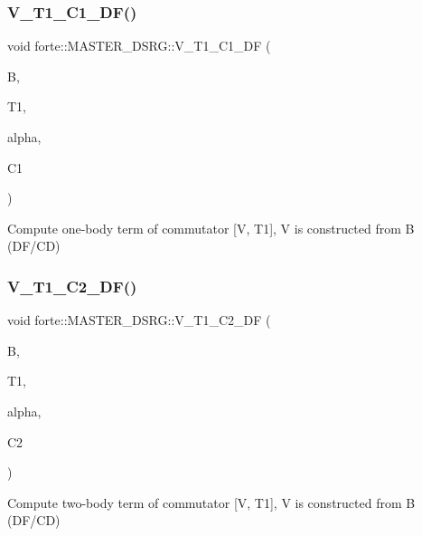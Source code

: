 \subsubsection{\texorpdfstring{V\+\_\+\+T1\+\_\+\+C1\+\_\+\+D\+F()}{V\_T1\_C1\_DF()}}
{\footnotesize\ttfamily void forte\+::\+M\+A\+S\+T\+E\+R\+\_\+\+D\+S\+R\+G\+::\+V\+\_\+\+T1\+\_\+\+C1\+\_\+\+DF (\begin{DoxyParamCaption}\item[{Blocked\+Tensor \&}]{B,  }\item[{Blocked\+Tensor \&}]{T1,  }\item[{const double \&}]{alpha,  }\item[{Blocked\+Tensor \&}]{C1 }\end{DoxyParamCaption})\hspace{0.3cm}{\ttfamily [protected]}}



Compute one-\/body term of commutator \mbox{[}V, T1\mbox{]}, V is constructed from B (D\+F/\+CD) 

\mbox{\label{classforte_1_1_m_a_s_t_e_r___d_s_r_g_abfca3ef3d6257c2a1229447dbe88680c}} 
\subsubsection{\texorpdfstring{V\+\_\+\+T1\+\_\+\+C2\+\_\+\+D\+F()}{V\_T1\_C2\_DF()}}
{\footnotesize\ttfamily void forte\+::\+M\+A\+S\+T\+E\+R\+\_\+\+D\+S\+R\+G\+::\+V\+\_\+\+T1\+\_\+\+C2\+\_\+\+DF (\begin{DoxyParamCaption}\item[{Blocked\+Tensor \&}]{B,  }\item[{Blocked\+Tensor \&}]{T1,  }\item[{const double \&}]{alpha,  }\item[{Blocked\+Tensor \&}]{C2 }\end{DoxyParamCaption})\hspace{0.3cm}{\ttfamily [protected]}}



Compute two-\/body term of commutator \mbox{[}V, T1\mbox{]}, V is constructed from B (D\+F/\+CD) 

